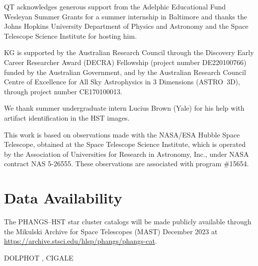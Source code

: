 \documentclass[linenumbers]{aastex63}
\begin{document}
QT acknowledges generous support from the Adelphic Educational Fund Wesleyan Summer Grants for a summer internship in Baltimore and thanks the Johns Hopkins University Department of Physics and Astronomy and the Space Telescope Science Institute for hosting him.

KG is supported by the Australian Research Council through the Discovery Early Career Researcher Award (DECRA) Fellowship (project number DE220100766) funded by the Australian Government, and by the Australian Research Council Centre of Excellence for All Sky Astrophysics in 3 Dimensions (ASTRO~3D), through project number CE170100013.

We thank summer undergraduate intern Lucius Brown (Yale) for his help with artifact identification in the HST images.

This work is based on observations made with the NASA/ESA Hubble Space Telescope, obtained at the Space Telescope Science Institute, which is operated by the Association of Universities for Research in Astronomy, Inc., under NASA contract NAS 5-26555. These observations are associated with program \#15654. 


\section*{Data Availability}
The PHANGS--HST star cluster catalogs will be made publicly available through the Mikulski Archive for Space Telescopes (MAST) December 2023 at \url{https://archive.stsci.edu/hlsp/phangs/phangs-cat}.

{DOLPHOT \citep[v2.0][]{dolphin_dolphot_2016}, CIGALE \citep{burgarella_star_2005,noll_analysis_2009,boquien_cigale_2019}}

%
   
 

\clearpage


\appendix
\end{document}
